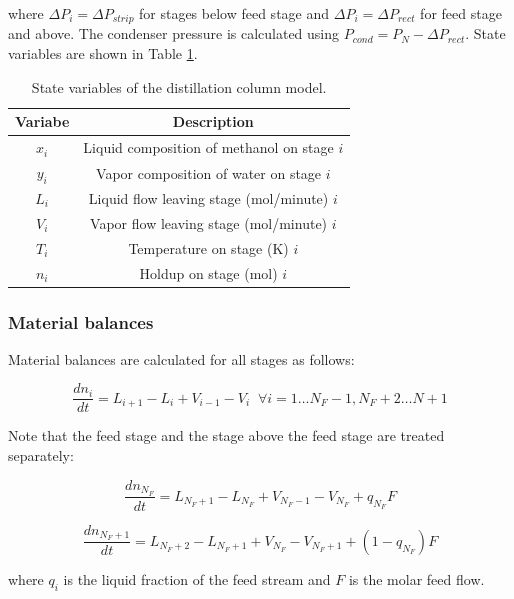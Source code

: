 where $\Delta P_i =\Delta P_{strip}$ for stages below feed stage and $\Delta P_i =\Delta P_{rect}$ for feed stage and above. The condenser pressure is calculated using $P_{cond}=P_{N} - \Delta P_{rect}$. State variables  are shown in Table \ref{tab:state_variables}.
\begin{table}
    \centering
    \caption{State variables of the distillation column model.}
    \begin{tabular}{cc}
        \textbf{Variabe} & \textbf{Description}  \\
        \hline
         $x_i$ &  Liquid composition of methanol on stage $i$ \\
         $y_i$ & Vapor composition of water on stage $i$\\
         $L_i$ & Liquid flow leaving stage (mol/minute) $i$  \\
         $V_i$  & Vapor flow leaving stage (mol/minute) $i$ \\
         $T_i$  & Temperature on stage (K) $i$ \\
         $n_i$  & Holdup on stage (mol) $i$ \\
         \hline
    \end{tabular}
    \label{tab:state_variables}
\end{table}

\subsubsection{Material balances}
Material balances are calculated for all stages as follows:

\begin{equation}
\frac{dn_i}{dt} = L_{i+1}-L_i + V_{i-1}-V_i \;\; \forall i=1 \dots N_F-1, N_F+2 \dots N+1
\end{equation}

Note that the feed stage and the stage above the feed stage are treated separately:

\begin{equation}
    \frac{dn_{N_F}}{dt} = L_{N_F+1}-L_{N_F} + V_{N_F-1}-V_{N_F} + q_{N_F}F   
\end{equation}

\begin{equation}
   \frac{dn_{N_F+1}}{dt} = L_{N_F+2}-L_{N_F+1} + V_{N_F}-V_{N_F+1} + (1-q_{N_F})F 
\end{equation}

where $q_i$ is the liquid fraction of the feed stream and $F$ is the molar feed flow.

